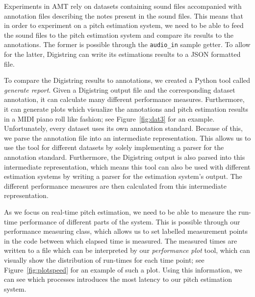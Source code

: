 \documentclass[a4paper,10pt,twocolumn]{article}
\begin{document}
Experiments in AMT rely on datasets containing sound files accompanied with annotation files describing the notes present in the sound files. This means that in order to experiment on a pitch estimation system, we need to be able to feed the sound files to the pitch estimation system and compare its results to the annotations. The former is possible through the \texttt{audio\_in} sample getter. To allow for the latter, Digistring can write its estimations results to a JSON formatted file.

To compare the Digistring results to annotations, we created a Python tool called \textit{generate report}. Given a Digistring output file and the corresponding dataset annotation, it can calculate many different performance measures. Furthermore, it can generate plots which visualize the annotations and pitch estimation results in a MIDI piano roll like fashion; see Figure~\ref{fig:dat3} for an example.
Unfortunately, every dataset uses its own annotation standard. Because of this, we parse the annotation file into an intermediate representation. This allows us to use the tool for different datasets by solely implementing a parser for the annotation standard. Furthermore, the Digistring output is also parsed into this intermediate representation, which means this tool can also be used with different estimation systems by writing a parser for the estimation system's output. The different performance measures are then calculated from this intermediate representation.

As we focus on real-time pitch estimation, we need to be able to measure the run-time performance of different parts of the system. This is possible through our performance measuring class, which allows us to set labelled measurement points in the code between which elapsed time is measured. The measured times are written to a file which can be interpreted by our \textit{performance plot} tool, which can visually show the distribution of run-times for each time point; see Figure~\ref{fig:plotspeed} for an example of such a plot. Using this information, we can see which processes introduces the most latency to our pitch estimation system.
\end{document}
